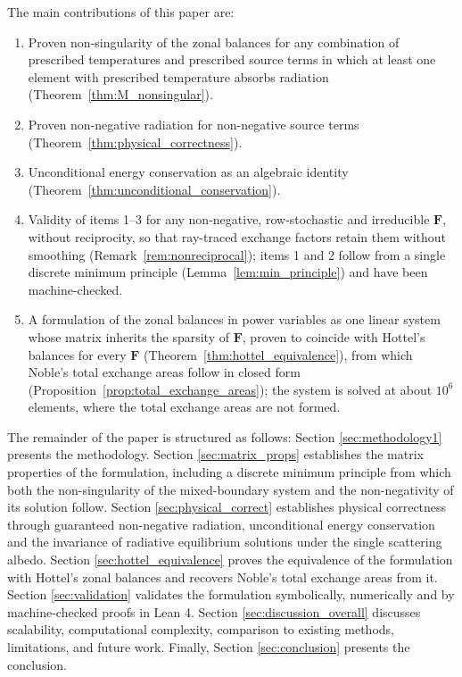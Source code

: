 \documentclass[preprint,1p,times]{elsarticle}
\theoremstyle{plain}
\theoremstyle{definition}
\theoremstyle{remark}
\begin{document}
The main contributions of this paper are:
\begin{enumerate}
\item Proven non-singularity of the zonal balances for any combination of prescribed temperatures and prescribed source terms in which at least one element with prescribed temperature absorbs radiation (Theorem~\ref{thm:M_nonsingular}).
\item Proven non-negative radiation for non-negative source terms (Theorem~\ref{thm:physical_correctness}).
\item Unconditional energy conservation as an algebraic identity (Theorem~\ref{thm:unconditional_conservation}).
\item Validity of items 1--3 for any non-negative, row-stochastic and irreducible $\mathbf{F}$, without reciprocity, so that ray-traced exchange factors retain them without smoothing (Remark~\ref{rem:nonreciprocal}); items 1 and 2 follow from a single discrete minimum principle (Lemma~\ref{lem:min_principle}) and have been machine-checked.
\item A formulation of the zonal balances in power variables as one linear system whose matrix inherits the sparsity of $\mathbf{F}$, proven to coincide with Hottel's balances for every $\mathbf{F}$ (Theorem~\ref{thm:hottel_equivalence}), from which Noble's total exchange areas follow in closed form (Proposition~\ref{prop:total_exchange_areas}); the system is solved at about $10^6$ elements, where the total exchange areas are not formed.
\end{enumerate}

The remainder of the paper is structured as follows: Section \ref{sec:methodology1} presents the methodology. Section \ref{sec:matrix_props} establishes the matrix properties of the formulation, including a discrete minimum principle from which both the non-singularity of the mixed-boundary system and the non-negativity of its solution follow. Section \ref{sec:physical_correct} establishes physical correctness through guaranteed non-negative radiation, unconditional energy conservation and the invariance of radiative equilibrium solutions under the single scattering albedo. Section \ref{sec:hottel_equivalence} proves the equivalence of the formulation with Hottel's zonal balances and recovers Noble's total exchange areas from it. Section \ref{sec:validation} validates the formulation symbolically, numerically and by machine-checked proofs in Lean 4. Section \ref{sec:discussion_overall} discusses scalability, computational complexity, comparison to existing methods, limitations, and future work. Finally, Section \ref{sec:conclusion} presents the conclusion.
\end{document}
